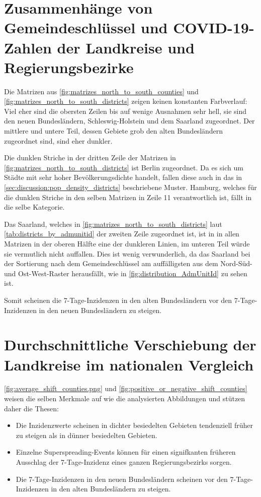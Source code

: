 \section{Zusammenhänge von Gemeindeschlüssel und COVID-19-Zahlen der Landkreise und Regierungsbezirke}
Die Matrizen aus \autoref{fig:matrizes_north_to_south_counties} und \autoref{fig:matrizes_north_to_south_districts} zeigen keinen konstanten Farbverlauf: Viel eher sind die obersten Zeilen bis auf wenige Ausnahmen sehr hell, sie sind den neuen Bundesländern, Schleswig-Holstein und dem Saarland zugeordnet. Der mittlere und untere Teil, dessen Gebiete grob den alten Bundesländern zugeordnet sind, sind eher dunkler.

Die dunklen Striche in der dritten Zeile der Matrizen in \autoref{fig:matrizes_north_to_south_districts} ist Berlin zugeordnet. Da es sich um Städte mit sehr hoher Bevölkerungsdichte handelt, fallen diese auch in das in \autoref{sec:discussion:pop_density_districts} beschriebene Muster. Hamburg, welches für die dunklen Striche in den selben Matrizen in Zeile 11 verantwortlich ist, fällt in die selbe Kategorie.

Das Saarland, welches in \autoref{fig:matrizes_north_to_south_districts} laut \autoref{tab:districts_by_admunitid} der zweiten Zeile zugeordnet ist, ist in in allen Matrizen in der oberen Hälfte eine der dunkleren Linien, im unteren Teil würde sie vermutlich nicht auffallen.
Dies ist wenig verwunderlich, da das Saarland bei der Sortierung nach dem Gemeindeschlüssel am auffälligsten aus dem Nord-Süd- und Ost-West-Raster herausfällt, wie in \autoref{fig:distribution_AdmUnitId} zu sehen ist.

Somit scheinen die 7-Tage-Inzidenzen in den alten Bundesländern vor den 7-Tage-Inzidenzen in den neuen Bundesländern zu steigen.


\section{Durchschnittliche Verschiebung der Landkreise im nationalen Vergleich}

\autoref{fig:average_shift_counties.png} und
\autoref{fig:positive_or_negative_shift_counties} weisen die selben Merkmale auf wie die analysierten Abbildungen  und stützen daher die Thesen:

\begin{itemize}
    \item Die Inzidenzwerte scheinen in dichter besiedelten Gebieten tendenziell früher zu steigen als in dünner besiedelten Gebieten.
    \item Einzelne Superspreading-Events können für einen signifkanten früheren Ausschlag der 7-Tage-Inzidenz eines ganzen Regierungsbezirks sorgen.
    \item Die 7-Tage-Inzidenzen in den neuen Bundesländern scheinen vor den 7-Tage-Inzidenzen in den alten Bundesländern zu steigen.
\end{itemize}
